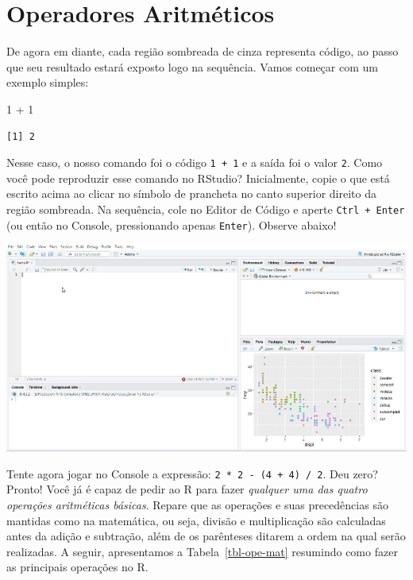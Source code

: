 \documentclass[
  letterpaper,
  DIV=11,
  numbers=noendperiod]{scrreprt}
\newenvironment{Shaded}{\begin{snugshade}}{\end{snugshade}}
\newcommand{\DecValTok}[1]{\textcolor[rgb]{0.68,0.00,0.00}{#1}}
\newcommand{\SpecialCharTok}[1]{\textcolor[rgb]{0.37,0.37,0.37}{#1}}
\begin{document}
\section{Operadores Aritméticos}\label{operadores-aritmuxe9ticos}

De agora em diante, cada região sombreada de cinza representa código, ao
passo que seu resultado estará exposto logo na sequência. Vamos começar
com um exemplo simples:

\begin{Shaded}
\begin{Highlighting}[]
\DecValTok{1} \SpecialCharTok{+} \DecValTok{1}
\end{Highlighting}
\end{Shaded}

\begin{verbatim}
[1] 2
\end{verbatim}

Nesse caso, o nosso comando foi o código \texttt{1\ +\ 1} e a saída foi
o valor \texttt{2}. Como você pode reproduzir esse comando no RStudio?
Inicialmente, copie o que está escrito acima ao clicar no símbolo de
prancheta no canto superior direito da região sombreada. Na sequência,
cole no Editor de Código e aperte \texttt{Ctrl\ +\ Enter} (ou então no
Console, pressionando apenas \texttt{Enter}). Observe abaixo!

\begin{center}
\includegraphics{images/1mais1.gif}
\end{center}

Tente agora jogar no Console a expressão:
\texttt{2\ *\ 2\ -\ (4\ +\ 4)\ /\ 2}. Deu zero? Pronto! Você já é capaz
de pedir ao R para fazer \emph{qualquer uma das quatro operações
aritméticas básicas}. Repare que as operações e suas precedências são
mantidas como na matemática, ou seja, divisão e multiplicação são
calculadas antes da adição e subtração, além de os parênteses ditarem a
ordem na qual serão realizadas. A seguir, apresentamos a
Tabela~\ref{tbl-ope-mat} resumindo como fazer as principais operações no
R.
\end{document}
